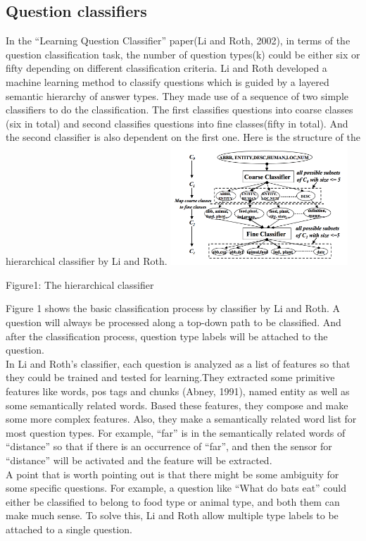 \documentclass[twoside]{article}
\begin{document}
\begin{multicols}{2}
\subsection{Question classifiers}
In the ``Learning Question Classifier'' paper(Li and Roth, 2002), in terms of the question classification task, the number of question types(k) could be either six or fifty depending on different classification criteria.  Li and Roth developed a machine learning method to classify questions which is guided by a layered semantic hierarchy of answer types. They made use of a sequence of two simple classifiers to do the classification. The first classifies questions into coarse classes (six in total) and second classifies questions into fine classes(fifty in total). And the second classifier is also dependent on the first one. Here is the structure of the hierarchical classifier by Li and Roth.
\includegraphics[width=0.5\textwidth]{structure.png}
\begin{center}
Figure1:  The hierarchical classifier 
\end{center}
Figure 1 shows the basic classification process by classifier by Li and Roth. A question will always be processed along a top-down path to be classified. And after the classification process, question type labels will be attached to the question.
\\In Li and Roth's classifier, each question is analyzed as a list of features so that they could be trained and tested for learning.They extracted some primitive features like words, pos tags and chunks (Abney, 1991), named entity as well as some semantically related words. Based these features, they compose and make some more complex features. Also, they make a semantically related word list for most question types. For example, ``far'' is in the semantically related words of ``distance'' so that if there is an occurrence of ``far'', and then the sensor for ``distance'' will be activated and the feature will be extracted.
\\A point that is worth pointing out is that there might be some ambiguity for some specific questions. For example, a question like ``What do bats eat'' could either be classified to belong to food type or animal type, and both them can make much sense. To solve this, Li and Roth allow multiple type labels to be attached to a single question.


\end{multicols}
\end{document}

